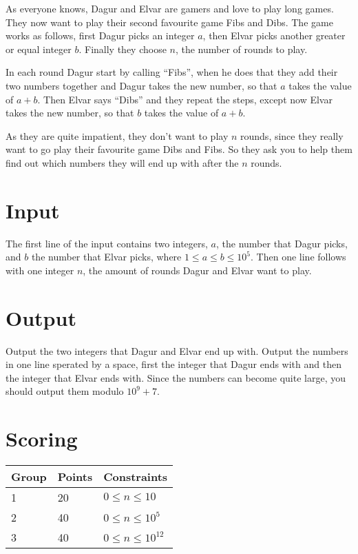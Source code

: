 As everyone knows, Dagur and Elvar are gamers and love to play long games.
They now want to play their second favourite game Fibs and Dibs.
The game works as follows, first Dagur picks an integer $a$, then Elvar picks another greater or equal integer $b$.
Finally they choose $n$, the number of rounds to play.

In each round Dagur start by calling ``Fibs'', when he does that they add their two numbers
together and Dagur takes the new number, so that $a$ takes the value of $a + b$.
Then Elvar says ``Dibs'' and they repeat the steps, except now Elvar takes the new number, so that $b$ takes the value of $a + b$.

As they are quite impatient, they don't want to play $n$ rounds, since they really want to go play their favourite game
Dibs and Fibs. So they ask you to help them find out which numbers they will end up with after the $n$ rounds.

\section*{Input}
The first line of the input contains two integers, $a$, the number that Dagur picks,
and $b$ the number that Elvar picks, where $1 \leq a \leq b \leq 10^5$.
Then one line follows with one integer $n$, the amount of rounds Dagur and Elvar want to play.

\section*{Output}
Output the two integers that Dagur and Elvar end up with.
Output the numbers in one line sperated by a space, first the integer that Dagur ends with
and then the integer that Elvar ends with. Since the numbers can become quite large,
you should output them modulo $10^9 + 7$.

\section*{Scoring}
\begin{tabular}{|l|l|l|}
\hline
Group & Points & Constraints \\ \hline
1     & 20   & $0 \leq n \leq 10$ \\ \hline
2     & 40   & $0 \leq n \leq 10^5$ \\ \hline
3     & 40   & $0 \leq n \leq 10^{12}$ \\ \hline
\end{tabular}

